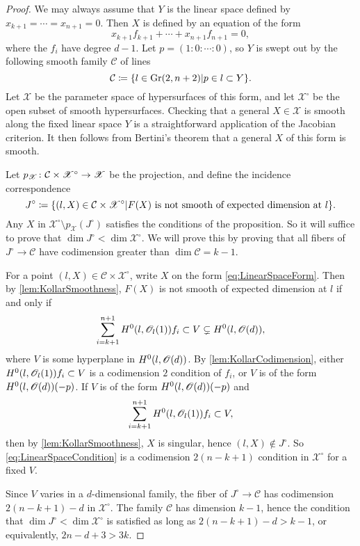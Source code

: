 \begin{proof}
	We may always assume that $Y$ is the linear space defined by $x_{k+1} = \cdots = x_{n+1} = 0$. Then  $X$ is defined by an equation of the form 
	\begin{equation}
		\label{eq:LinearSpaceForm}
		x_{k+1}f_{k+1} + \cdots + x_{n+1}f_{n+1} = 0,
	\end{equation}
	where the $f_i$ have degree $d-1$. Let $p = (1:0:\cdots:0)$, so $Y$ is swept out by the following smooth family $\mathcal{C}$ of lines
	\[\mathcal{C} \coloneqq \lbrace l \in \operatorname{Gr}(2,n+2) \vert p \in l \subset Y\rbrace.\]
Let $\mathscr{X}$ be the parameter space of hypersurfaces of this form, and let $\mathscr{X}^\circ$ be the open subset of smooth hypersurfaces. Checking that a general $X \in \mathscr{X}$ is smooth along the fixed linear space $Y$ is a straightforward application of the Jacobian criterion. It then follows from Bertini's theorem that a general $X$ of this form is smooth.
	
	Let $p_{\mathscr{X}} \colon \mathcal{C} \times \mathscr{X}^\circ \to \mathscr{X}$ be the projection, and define the incidence correspondence
	\[J^\circ \coloneqq \lbrace(l,X) \in \mathcal{C} \times \mathscr{X}^\circ \vert F(X) \text{ is not smooth of expected dimension at } l\rbrace.\]
Any $X$ in $\mathscr{X}^\circ \setminus p_{\mathscr{X}}(J^\circ)$ satisfies the conditions of the proposition. So it will suffice to prove that $\dim J^\circ < \dim \mathscr{X}^\circ$. We will prove this by proving that all fibers of $J^\circ \to \mathcal{C}$ have codimension greater than $\dim \mathcal{C} = k-1$.

For a point $(l,X) \in {\mathcal{C}} \times \mathscr{X}^\circ$, write $X$ on the form \eqref{eq:LinearSpaceForm}. Then by \cref{lem:KollarSmoothness}, $F(X)$ is not smooth of expected dimension at $l$ if and only if
	\begin{equation}
		\label{eq:LinearSpaceCondition}
		\sum_{i=k+1}^{n+1}H^0(l,\mathscr{O}_l(1))f_i \subset V \subsetneq H^0(l,\mathscr{O}(d)),
	\end{equation}
	where $V$ is some hyperplane in $H^0(l,\mathscr{O}(d))$. By \cref{lem:KollarCodimension}, either $H^0(l,\mathscr{O}_l(1))f_i \subset V$ is a codimension $2$ condition of $f_i$, or $V$ is of the form $H^0(l,\mathscr{O}(d))(-p)$. If $V$ is of the form $H^0(l,\mathscr{O}(d))(-p)$ and 
	\[\sum_{i=k+1}^{n+1}H^0(l,\mathscr{O}_l(1))f_i \subset V,\]
	then by \cref{lem:KollarSmoothness}, $X$ is singular, hence $(l,X) \not\in J^\circ$. So \eqref{eq:LinearSpaceCondition} is a codimension $2(n-k+1)$ condition in $\mathscr{X}^\circ$ for a fixed $V$. 
	
	Since $V$ varies in a $d$-dimensional family, the fiber of $J^\circ \to \mathcal{C}$ has codimension $2(n-k+1)-d$ in $\mathscr{X}^\circ$. The family $\mathcal{C}$ has dimension $k-1$, hence the condition that $\dim J^\circ < \dim \mathscr{X}^\circ$ is satisfied as long as $2(n-k+1)-d > k-1$, or equivalently, $2n-d+3 > 3k$.
\end{proof}
